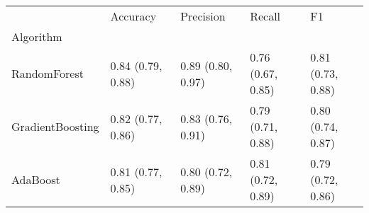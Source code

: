 \begin{tabular}{lllll}
\toprule
{} &           Accuracy &          Precision &             Recall &                 F1 \\
Algorithm        &                    &                    &                    &                    \\
\midrule
RandomForest     &  0.84 (0.79, 0.88) &  0.89 (0.80, 0.97) &  0.76 (0.67, 0.85) &  0.81 (0.73, 0.88) \\
GradientBoosting &  0.82 (0.77, 0.86) &  0.83 (0.76, 0.91) &  0.79 (0.71, 0.88) &  0.80 (0.74, 0.87) \\
AdaBoost         &  0.81 (0.77, 0.85) &  0.80 (0.72, 0.89) &  0.81 (0.72, 0.89) &  0.79 (0.72, 0.86) \\
\bottomrule
\end{tabular}

